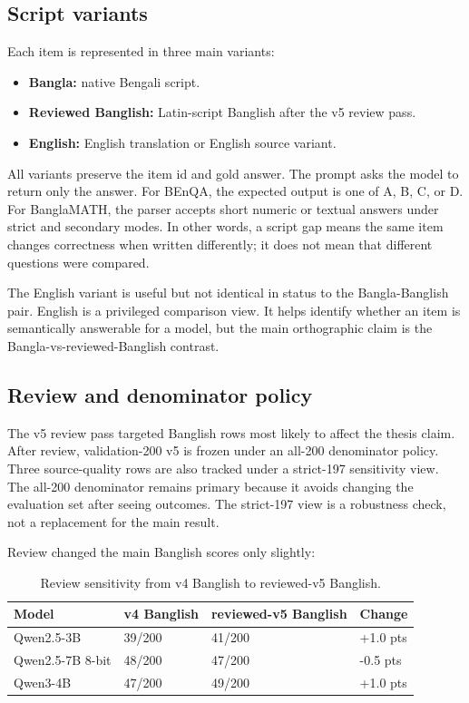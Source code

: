 \subsection{Script variants}

Each item is represented in three main variants:

\begin{itemize}
\item \textbf{Bangla:} native Bengali script.
\item \textbf{Reviewed Banglish:} Latin-script Banglish after the v5 review pass.
\item \textbf{English:} English translation or English source variant.
\end{itemize}

All variants preserve the item id and gold answer. The prompt asks the model to return only the answer. For BEnQA, the expected output is one of A, B, C, or D. For BanglaMATH, the parser accepts short numeric or textual answers under strict and secondary modes. In other words, a script gap means the same item changes correctness when written differently; it does not mean that different questions were compared.

The English variant is useful but not identical in status to the Bangla-Banglish pair. English is a privileged comparison view. It helps identify whether an item is semantically answerable for a model, but the main orthographic claim is the Bangla-vs-reviewed-Banglish contrast.

\subsection{Review and denominator policy}

The v5 review pass targeted Banglish rows most likely to affect the thesis claim. After review, validation-200 v5 is frozen under an all-200 denominator policy. Three source-quality rows are also tracked under a strict-197 sensitivity view. The all-200 denominator remains primary because it avoids changing the evaluation set after seeing outcomes. The strict-197 view is a robustness check, not a replacement for the main result.

Review changed the main Banglish scores only slightly:

\begin{table}[H]
\centering
\caption{Review sensitivity from v4 Banglish to reviewed-v5 Banglish.}
\label{tab:review-sensitivity}
\small
\begin{tabular}{llll}
\hline
Model & v4 Banglish & reviewed-v5 Banglish & Change \\
\hline
Qwen2.5-3B & 39/200 & 41/200 & +1.0 pts \\
Qwen2.5-7B 8-bit & 48/200 & 47/200 & -0.5 pts \\
Qwen3-4B & 47/200 & 49/200 & +1.0 pts \\
\hline
\end{tabular}%
\end{table}

